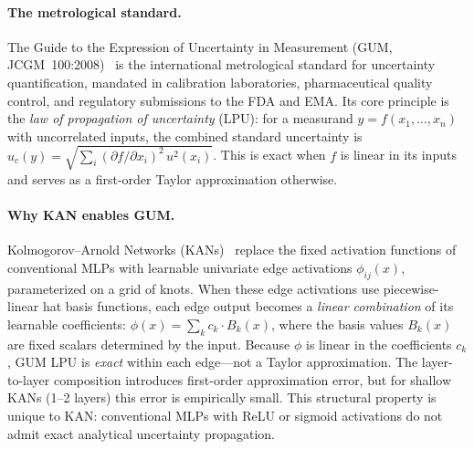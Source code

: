 \documentclass{article}
\begin{document}
\paragraph{The metrological standard.}
The Guide to the Expression of Uncertainty in Measurement
(GUM, JCGM~100:2008)~\citep{gum2008} is the international metrological
standard for uncertainty quantification, mandated in calibration laboratories,
pharmaceutical quality control, and regulatory submissions to the FDA and EMA.
Its core principle is the \emph{law of propagation of uncertainty} (LPU): for
a measurand $y = f(x_1, \ldots, x_n)$ with uncorrelated inputs, the combined
standard uncertainty is
$u_c(y) = \sqrt{\sum_i (\partial f / \partial x_i)^2 \, u^2(x_i)}$.
This is exact when $f$ is linear in its inputs and serves as a first-order
Taylor approximation otherwise.

\paragraph{Why KAN enables GUM.}
Kolmogorov--Arnold Networks (KANs)~\citep{liu2024kan} replace the fixed
activation functions of conventional MLPs with learnable univariate edge
activations $\phi_{ij}(x)$, parameterized on a grid of knots.  When these
edge activations use piecewise-linear hat basis functions, each edge output
becomes a \emph{linear combination} of its learnable coefficients:
$\phi(x) = \sum_k c_k \cdot B_k(x)$, where the basis values $B_k(x)$ are
fixed scalars determined by the input.  Because $\phi$ is linear in the
coefficients $c_k$, GUM LPU is \emph{exact} within each edge---not a Taylor
approximation.  The layer-to-layer composition introduces first-order
approximation error, but for shallow KANs (1--2 layers) this error is
empirically small.  This structural property is unique to KAN: conventional
MLPs with ReLU or sigmoid activations do not admit exact analytical
uncertainty propagation.
\end{document}
